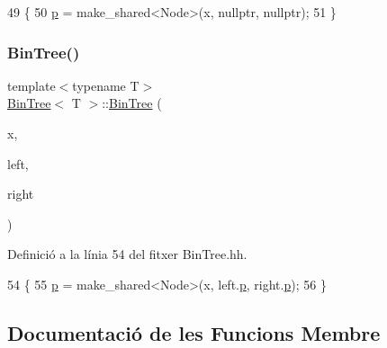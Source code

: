 \begin{DoxyCode}
49                                   \{
50         \hyperlink{class_bin_tree_afe3647af1dda90f6ddf1deee6560fcf1}{p} = make\_shared<Node>(x, \textcolor{keyword}{nullptr}, \textcolor{keyword}{nullptr});
51     \}
\end{DoxyCode}
\mbox{\label{class_bin_tree_adb7eeff76d08130c943b36af215eb521}} 
\subsubsection{\texorpdfstring{Bin\+Tree()}{BinTree()}\hspace{0.1cm}{\footnotesize\ttfamily [4/4]}}
{\footnotesize\ttfamily template$<$typename T$>$ \\
\hyperlink{class_bin_tree}{Bin\+Tree}$<$ T $>$\+::\hyperlink{class_bin_tree}{Bin\+Tree} (\begin{DoxyParamCaption}\item[{const T \&}]{x,  }\item[{const \hyperlink{class_bin_tree}{Bin\+Tree}$<$ T $>$ \&}]{left,  }\item[{const \hyperlink{class_bin_tree}{Bin\+Tree}$<$ T $>$ \&}]{right }\end{DoxyParamCaption})\hspace{0.3cm}{\ttfamily [explicit]}}



Definició a la línia 54 del fitxer Bin\+Tree.\+hh.


\begin{DoxyCode}
54                                                                              \{
55         \hyperlink{class_bin_tree_afe3647af1dda90f6ddf1deee6560fcf1}{p} = make\_shared<Node>(x, left.\hyperlink{class_bin_tree_afe3647af1dda90f6ddf1deee6560fcf1}{p}, right.\hyperlink{class_bin_tree_afe3647af1dda90f6ddf1deee6560fcf1}{p});
56     \}
\end{DoxyCode}


\subsection{Documentació de les Funcions Membre}
\mbox{\label{class_bin_tree_a74cda259ba5c25b8ee38ed4dc33e4fad}} 
